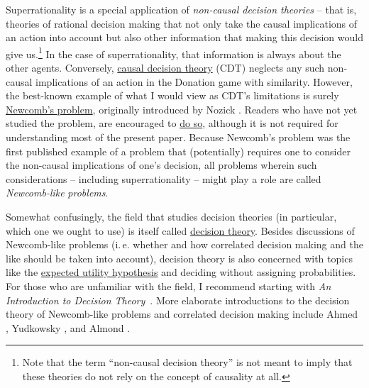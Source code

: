Superrationality is a special application of \emph{non-causal decision
theories} -- that is, theories of rational decision making that not only
take the causal implications of an action into account but also other
information that making this decision would give us.\footnote{Note
  that the term ``non-causal decision theory'' is not meant to imply
  that these theories do not rely on the concept of causality at all.}
In the case of superrationality, that information is always about the
other agents. Conversely,
\href{https://en.wikipedia.org/wiki/Causal_decision_theory}{causal
decision theory} (CDT)
\parencite{Weirich2016-gq,Joyce1999-iv,Lewis1981-ct,Skyrms1982-mi,Gibbard1978-nw}
neglects any such non-causal implications of an action in the Donation
game with similarity. However, the best-known example of what I would
view as CDT's limitations is surely
\href{https://en.wikipedia.org/wiki/Newcomb\%27s_paradox}{Newcomb's
problem}, originally introduced by Nozick 
\citeyear{Nozick1969-op}. Readers who have not yet studied
the problem, are encouraged to
\href{http://lesswrong.com/lw/nc/newcombs_problem_and_regret_of_rationality/}{do
so}, although it is not required for understanding most of the present
paper. Because Newcomb's problem was the first published example of a
problem that (potentially) requires one to consider the non-causal
implications of one's decision, all problems wherein such considerations
-- including superrationality -- might play a role are called
\emph{Newcomb-like} \emph{problems}.

Somewhat confusingly, the field that studies decision theories (in
particular, which one we ought to use) is itself called
\href{https://en.wikipedia.org/wiki/Decision_theory}{decision
theory}. Besides discussions of Newcomb-like problems (i.\,e. whether
and how correlated decision making and the like should be taken into
account), decision theory is also concerned with topics like the
\href{https://en.wikipedia.org/wiki/Expected_utility_hypothesis}{expected
utility hypothesis} and deciding without assigning probabilities. For
those who are unfamiliar with the field, I recommend starting with \emph{An Introduction to Decision
Theory}~\parencite{Peterson2017-pa}. More elaborate introductions to the decision theory of
Newcomb-like problems and correlated decision making include Ahmed \citeyear{Ahmed2014-ec},
Yudkowsky \citeyear{Yudkowsky2010-ky}, and
Almond \citeyear{Almond2010-xn}.

